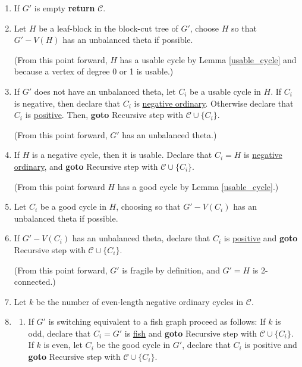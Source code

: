 \documentclass[12pt]{article}
\begin{document}
\medskip



        \begin{enumerate}
            \item If $G'$ is empty \textbf{return} $\mathcal{C}$.
            \item Let $H$ be a leaf-block in the block-cut tree of $G'$, choose $H$ so that $G' - V(H)$ has an unbalanced theta if possible.

            (From this point forward, $H$ has a usable cycle by Lemma \ref{usable_cycle} and because a vertex of degree 0 or 1 is usable.)
            
            \item \label{step3} If $G'$ does not have an unbalanced theta, let $C_i$ be a usable cycle in $H$. If $C_i$ is negative, then declare that $C_i$ is \underline{negative ordinary}. Otherwise declare that $C_i$ is \underline{positive}. Then, \textbf{goto} Recursive step with $\mathcal{C} \cup \{C_i\}$.
            
            (From this point forward, $G'$ has an unbalanced theta.)
            \item \label{step5} If $H$ is a negative cycle, then it is usable. Declare that $C_i= H$ is \underline{negative ordinary}, and \textbf{goto} Recursive step with $\mathcal{C} \cup \{C_i\}$.
            
            (From this point forward $H$ has a good cycle by Lemma \ref{usable_cycle}.)
            
            \item \label{step7}Let $C_i$ be a good cycle in $H$, choosing so that $G'- V(C_i)$ has an unbalanced theta if possible.
            
            \item\label{step6} If $G' - V(C_i)$ has an unbalanced theta, declare that $C_i$ is \underline{positive} and \textbf{goto} Recursive step with $\mathcal{C} \cup \{C_i\}$.

            (From this point forward, $G'$ is fragile by definition, and $G' = H$ is 2-connected.)

            \item Let $k$ be the number of even-length negative ordinary cycles in $\mathcal{C}$.
            
            \item \label{unbalThetaStep}
            \begin{enumerate}
                \item \label{fishStep}If $G'$ is switching equivalent to a fish graph proceed as follows: If $k$ is odd, declare that $C_i = G'$ is \underline{fish} and \textbf{goto} Recursive step with $\mathcal{C} \cup \{C_i\}$. If $k$ is even, let $C_i$ be the good cycle in $G'$, declare that $C_i$ is positive and \textbf{goto} Recursive step with $\mathcal{C} \cup \{C_i\}$.


\end{enumerate}
\end{enumerate}
\end{document}
